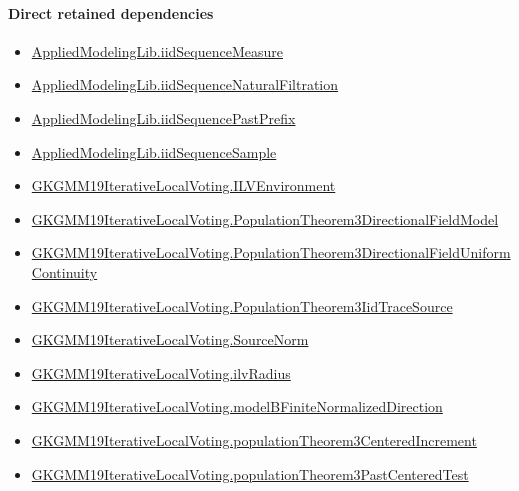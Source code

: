 \documentclass[10pt]{article}
\begin{document}
\paragraph{Direct retained dependencies}
\begin{itemize}\raggedright
\item \hyperlink{governing-declaration-f1b1ee19fc287ae5}{Applied\allowbreak{}Modeling\allowbreak{}Lib.\allowbreak{}iid\allowbreak{}Sequence\allowbreak{}Measure}
\item \hyperlink{governing-declaration-e6e69ddc4ae6dcb6}{Applied\allowbreak{}Modeling\allowbreak{}Lib.\allowbreak{}iid\allowbreak{}Sequence\allowbreak{}Natural\allowbreak{}Filtration}
\item \hyperlink{governing-declaration-4bed61cd5f6d314a}{Applied\allowbreak{}Modeling\allowbreak{}Lib.\allowbreak{}iid\allowbreak{}Sequence\allowbreak{}Past\allowbreak{}Prefix}
\item \hyperlink{governing-declaration-92cd13a68efc3be4}{Applied\allowbreak{}Modeling\allowbreak{}Lib.\allowbreak{}iid\allowbreak{}Sequence\allowbreak{}Sample}
\item \hyperlink{governing-declaration-df2ca62df1846667}{GKGMM19\allowbreak{}Iterative\allowbreak{}Local\allowbreak{}Voting.\allowbreak{}ILV\allowbreak{}Environment}
\item \hyperlink{governing-declaration-30327078fcfa0789}{GKGMM19\allowbreak{}Iterative\allowbreak{}Local\allowbreak{}Voting.\allowbreak{}Population\allowbreak{}Theorem3\allowbreak{}Directional\allowbreak{}Field\allowbreak{}Model}
\item \hyperlink{governing-declaration-d2d3633d4b732b10}{GKGMM19\allowbreak{}Iterative\allowbreak{}Local\allowbreak{}Voting.\allowbreak{}Population\allowbreak{}Theorem3\allowbreak{}Directional\allowbreak{}Field\allowbreak{}Uniform\allowbreak{}Continuity}
\item \hyperlink{governing-declaration-f8078eb1870f8a52}{GKGMM19\allowbreak{}Iterative\allowbreak{}Local\allowbreak{}Voting.\allowbreak{}Population\allowbreak{}Theorem3\allowbreak{}Iid\allowbreak{}Trace\allowbreak{}Source}
\item \hyperlink{governing-declaration-6fa4ab9852321b03}{GKGMM19\allowbreak{}Iterative\allowbreak{}Local\allowbreak{}Voting.\allowbreak{}Source\allowbreak{}Norm}
\item \hyperlink{governing-declaration-2cfd8c76662024e1}{GKGMM19\allowbreak{}Iterative\allowbreak{}Local\allowbreak{}Voting.\allowbreak{}ilv\allowbreak{}Radius}
\item \hyperlink{governing-declaration-20e8ece513543e43}{GKGMM19\allowbreak{}Iterative\allowbreak{}Local\allowbreak{}Voting.\allowbreak{}model\allowbreak{}B\allowbreak{}Finite\allowbreak{}Normalized\allowbreak{}Direction}
\item \hyperlink{governing-declaration-f172e1201669c9b1}{GKGMM19\allowbreak{}Iterative\allowbreak{}Local\allowbreak{}Voting.\allowbreak{}population\allowbreak{}Theorem3\allowbreak{}Centered\allowbreak{}Increment}
\item \hyperlink{governing-declaration-89bada5391f7da9a}{GKGMM19\allowbreak{}Iterative\allowbreak{}Local\allowbreak{}Voting.\allowbreak{}population\allowbreak{}Theorem3\allowbreak{}Past\allowbreak{}Centered\allowbreak{}Test}
\end{itemize}
\end{document}
